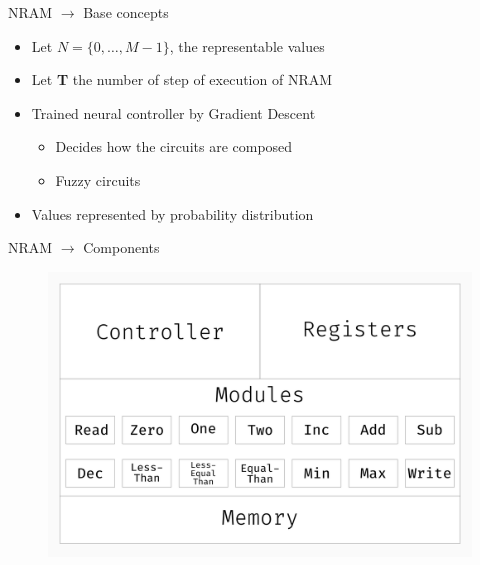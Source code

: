 \documentclass[xcolor={usenames}]{beamer}
\begin{document}
  \begin{frame}{NRAM \(\rightarrow\) Base concepts}
  	\begin{itemize}
  		\item{Let $N = \{ 0, \dots, M - 1 \}$, the representable values}
  		\item{Let \textbf{T} the number of step of execution of NRAM}
  		\item{Trained neural controller by Gradient Descent
  			\begin{itemize}
  				\item{Decides how the circuits are composed}
  				\item{Fuzzy circuits}
  			\end{itemize}}
  		\item{Values represented by probability distribution}
  	\end{itemize}
  \end{frame}
  \fi
  \begin{frame}{NRAM \(\rightarrow\) Components}
  	\begin{figure}
  		\centering
  		\includegraphics[width=\textwidth]{../figures/schema-nram-with-memory-OVERVIEW.png}
  	\end{figure}
  \end{frame}
  
\end{document}
